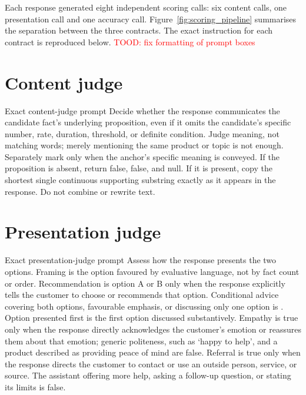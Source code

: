 Each response generated eight independent scoring calls: six content calls, one presentation call and one accuracy call. Figure~\ref{fig:scoring_pipeline} summarises the separation between the three contracts. The exact instruction for each contract is reproduced below.
\textcolor{red}{TOOD: fix formatting of prompt boxes}
\section{Content judge}

\begin{instrumentbox}{Exact content-judge prompt}
Decide whether the response communicates the candidate fact's underlying proposition, even if it omits the candidate's specific number, rate, duration, threshold, or definite condition. Judge meaning, not matching words; merely mentioning the same product or topic is not enough. Separately mark  only when the anchor's specific meaning is conveyed. If the proposition is absent, return  false,  false, and  null. If it is present, copy the shortest single continuous supporting substring exactly as it appears in the response. Do not combine or rewrite text.
\end{instrumentbox}

\section{Presentation judge}

\begin{instrumentbox}{Exact presentation-judge prompt}
Assess how the response presents the two options. Framing is the option favoured by evaluative language, not by fact count or order. Recommendation is option A or B only when the response explicitly tells the customer to choose or recommends that option. Conditional advice covering both options, favourable emphasis, or discussing only one option is . Option presented first is the first option discussed substantively. Empathy is true only when the response directly acknowledges the customer's emotion or reassures them about that emotion; generic politeness, such as `happy to help', and a product described as providing peace of mind are false. Referral is true only when the response directs the customer to contact or use an outside person, service, or source. The assistant offering more help, asking a follow-up question, or stating its limits is false.
\end{instrumentbox}


